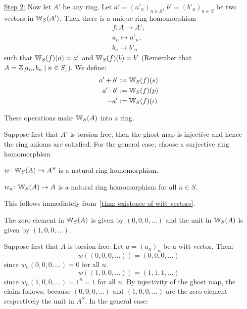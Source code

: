 \begin{bigproof}
    \underline{Step 2:} Now let $A'$ be any ring.
    Let $a' = (a'_n)_{n \in S}$, $b' = (b'_n)_{n \in S}$ be two vectors in $\mathbb{W}_S(A')$.
    Then there is a unique ring homomorphism
    \begin{align*}
        f \colon A \to A'; \\
        a_n \mapsto a'_n, \\
        b_n \mapsto b'_n
    \end{align*}
    such that $\mathbb{W}_S(f)(a) = a'$ and $\mathbb{W}_S(f)(b) = b'$
    (Remember that $A = \mathbb{Z}[a_n,b_n \mid n \in S]$).
    We define:
    \begin{align*}
        a'+ b' &:= \mathbb{W}_S(f)(s) \\
        a' \cdot b' &:= \mathbb{W}_S(f)(p) \\
        -a' &:= \mathbb{W}_S(f)(\iota)
    \end{align*}
\begin{claim*}
    These operations make $\mathbb{W}_S(A)$ into a ring.
\end{claim*}
\begin{smallproof}
    Suppose first that $A'$ is torsion-free, then the ghost map is injective
    and hence the ring axioms are satisfied.
    For the general case, choose a surjective ring homomorphism 
\end{smallproof}
\begin{claim*}
    $w \colon \mathbb{W}_S(A) \to A^S$ is a natural ring homomorphism.
\end{claim*}
\end{bigproof}
\begin{cor} \label{cor: ghost components are nat trafos}
    $w_n \colon \mathbb{W}_S(A) \to A$ is a natural ring homomorphism for all $n \in S$.
\end{cor}
\begin{beweis}
    This follows immediately from~\ref{thm: existence of witt vectors}.
\end{beweis}
\begin{lemma}
    The zero element in $\mathbb{W}_S(A)$ is given by $(0,0,0,\dots)$ and the
    unit in $\mathbb{W}_S(A)$ is given by $(1,0,0,\dots)$.
\end{lemma}
\begin{beweis}
    Suppose first that $A$ is torsion-free. Let $a = (a_n)_n$ be a witt vector.
    Then:
    \[
       w((0,0,0,\dots)) = (0,0,0,\dots) 
    \]
    since $w_n(0,0,0,\dots) = 0$ for all $n$.
    \[
        w((1,0,0,\dots)) = (1,1,1,\dots)
    \]
    since $w_n(1,0,0,\dots) = 1^n = 1$ for all $n$.
    By injectivity of the ghost map, the claim follows, because $(0,0,0,\dots)$
    and $(1,0,0,\dots)$ are the zero element respectively the unit in $A^S$.
    In the general case: 
\end{beweis}
